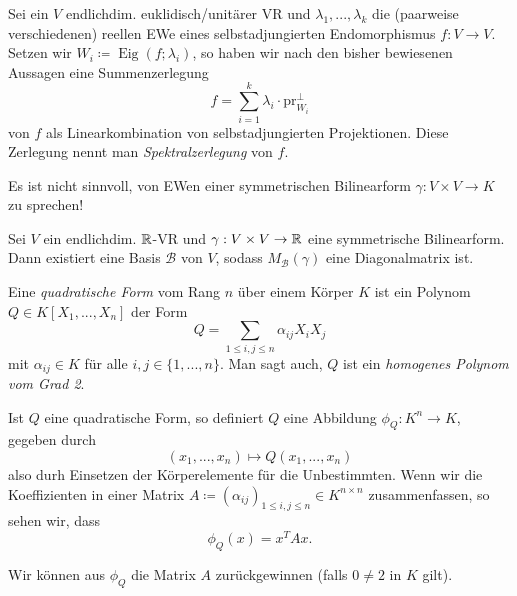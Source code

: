 \documentclass{cheat-sheet}
\DeclareMathOperator{\Eig}{Eig}
\newcommand{\BB}{\mathcal{B}}
\begin{document}

\begin{defn}
  Sei ein $V$ endlichdim. euklidisch/unitärer VR und $\lambda_1, ..., \lambda_k$ die (paarweise verschiedenen) reellen EWe eines selbstadjungierten Endomorphismus $f : V \to V$. Setzen wir $W_i \coloneqq \Eig(f; \lambda_i)$, so haben wir nach den bisher bewiesenen Aussagen eine Summenzerlegung
  \[ f = \sum_{i=1}^k \lambda_i \cdot \mathrm{pr}_{W_i}^{\perp} \]
  von $f$ als Linearkombination von selbstadjungierten Projektionen. Diese Zerlegung nennt man \emph{Spektralzerlegung} von $f$.
\end{defn}

\begin{bem}
  Es ist nicht sinnvoll, von EWen einer symmetrischen Bilinearform $\gamma : V \times V \to K$ zu sprechen!
\end{bem}

\begin{satz}
  Sei $V$ ein endlichdim. $\mathbb{R}$-VR und $\gamma : V \times V \to \mathbb{R}$ eine symmetrische Bilinearform. Dann existiert eine Basis $\BB$ von $V$, sodass $M_{\BB}(\gamma)$ eine Diagonalmatrix ist.
\end{satz}

\begin{defn}
  Eine \emph{quadratische Form} vom Rang $n$ über einem Körper $K$ ist ein Polynom $Q \in K[X_1, ..., X_n]$ der Form
  \[ Q = \sum_{1 \le i,j \le n} \alpha_{ij} X_i X_j \]
  mit $\alpha_{ij} \in K$ für alle $i, j \in \{ 1, ..., n \}$. Man sagt auch, $Q$ ist ein \emph{homogenes Polynom vom Grad 2}.
\end{defn}

\begin{bem}
  Ist $Q$ eine quadratische Form, so definiert $Q$ eine Abbildung $\phi_Q : K^n \to K$, gegeben durch
  \[ (x_1, ..., x_n) \mapsto Q(x_1, ..., x_n) \]
  also durh Einsetzen der Körperelemente für die Unbestimmten. Wenn wir die Koeffizienten in einer Matrix $A \coloneqq (\alpha_{ij})_{1 \le i, j \le n} \in K^{n \times n}$ zusammenfassen, so sehen wir, dass
  \[ \phi_Q(x) = x^T A x. \]
\end{bem}

\begin{satz}
  Wir können aus $\phi_Q$ die Matrix $A$ zurückgewinnen (falls $0 \not= 2$ in $K$ gilt).
\end{satz}

\end{document}
